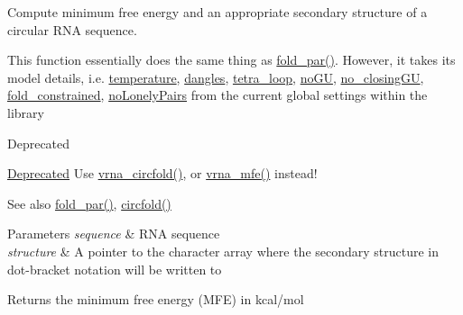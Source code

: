 Compute minimum free energy and an appropriate secondary structure of a circular R\+NA sequence. 

This function essentially does the same thing as \hyperlink{group__mfe__fold__single_ga2bc41df5d71fee6fd8da9904ee65d8fb}{fold\+\_\+par()}. However, it takes its model details, i.\+e. \hyperlink{group__model__details_gab4b11c8d9c758430960896bc3fe82ead}{temperature}, \hyperlink{group__model__details_ga72b511ed1201f7e23ec437e468790d74}{dangles}, \hyperlink{group__model__details_ga4f6265bdf0ead7ff4628a360adbfd77e}{tetra\+\_\+loop}, \hyperlink{group__model__details_gabf380d09e4f1ab94fc6af57cf0ad5d32}{no\+GU}, \hyperlink{group__model__details_gaa8d1c7b92489179e1eafa562b7bdd259}{no\+\_\+closing\+GU}, \hyperlink{fold__vars_8h_a0afc287c2464866d94858c39175154af}{fold\+\_\+constrained}, \hyperlink{group__model__details_ga097eccaabd6ae8b4fef83cccff85bb5d}{no\+Lonely\+Pairs} from the current global settings within the library

\begin{DoxyRefDesc}{Deprecated}
\item[\hyperlink{deprecated__deprecated000072}{Deprecated}]Use \hyperlink{group__mfe__fold__single_gaf973483d8acbc8cc9aacfc8a9b7f0074}{vrna\+\_\+circfold()}, or \hyperlink{group__mfe__fold_gabd3b147371ccf25c577f88bbbaf159fd}{vrna\+\_\+mfe()} instead!\end{DoxyRefDesc}


\begin{DoxySeeAlso}{See also}
\hyperlink{group__mfe__fold__single_ga2bc41df5d71fee6fd8da9904ee65d8fb}{fold\+\_\+par()}, \hyperlink{group__mfe__fold__single_ga4ac63ab3e8d9a80ced28b8052d94e423}{circfold()}
\end{DoxySeeAlso}

\begin{DoxyParams}{Parameters}
{\em sequence} & R\+NA sequence \\
\hline
{\em structure} & A pointer to the character array where the secondary structure in dot-\/bracket notation will be written to \\
\hline
\end{DoxyParams}
\begin{DoxyReturn}{Returns}
the minimum free energy (M\+FE) in kcal/mol 
\end{DoxyReturn}
